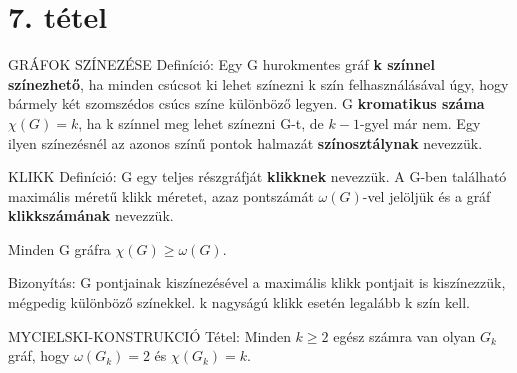\section{7. tétel}

\begin{definicio}{
GRÁFOK SZÍNEZÉSE Definíció}: Egy G hurokmentes gráf \textbf{k színnel színezhető}, ha minden csúcsot ki lehet színezni k szín felhasználásával úgy, hogy bármely két szomszédos csúcs színe különböző legyen. G \textbf{kromatikus száma} $\chi(G) = k$, ha k színnel meg lehet színezni G-t, de $k - 1$-gyel már nem. Egy ilyen színezésnél az azonos színű pontok halmazát \textbf{színosztálynak} nevezzük.
\end{definicio}
\begin{definicio}{
KLIKK Definíció}: G egy teljes részgráfját \textbf{klikknek} nevezzük. A G-ben található maximális méretű klikk méretet, azaz pontszámát $\omega(G)$-vel jelöljük és a gráf \textbf{klikkszámának} nevezzük.
\end{definicio}
\begin{tetel}{
Minden G gráfra $\chi(G) \geq \omega(G)$}.
\end{tetel}
\begin{leftbar}
Bizonyítás: G pontjainak kiszínezésével a maximális klikk pontjait is kiszínezzük, mégpedig különböző színekkel. k nagyságú klikk esetén legalább k szín kell.
\end{leftbar}
\begin{tetel}{
MYCIELSKI-KONSTRUKCIÓ Tétel}: Minden $k \geq 2$ egész számra van olyan $G_k$ gráf, hogy $\omega(G_k) = 2$ és $\chi(G_k) = k$.
\end{tetel}
